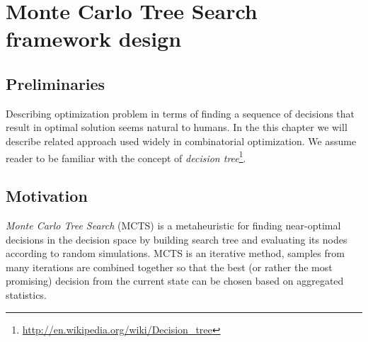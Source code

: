 \chapter{Monte Carlo Tree Search framework design}

\section{Preliminaries}
Describing optimization problem in terms of finding a sequence of decisions
that result in optimal solution seems natural to humans. In the this chapter we
will describe related approach used widely in combinatorial optimization. We
assume reader to be familiar with the concept of \emph{decision
tree}\footnote{\url{http://en.wikipedia.org/wiki/Decision_tree}}.

\section{Motivation}
\emph{Monte Carlo Tree Search} (MCTS) is a metaheuristic for finding
near-optimal decisions in the decision space by building search tree and
evaluating its nodes according to random simulations.
MCTS is an iterative method, samples from many iterations are combined together
so that the best (or rather the most promising) decision from the current state
can be chosen based on aggregated statistics.

